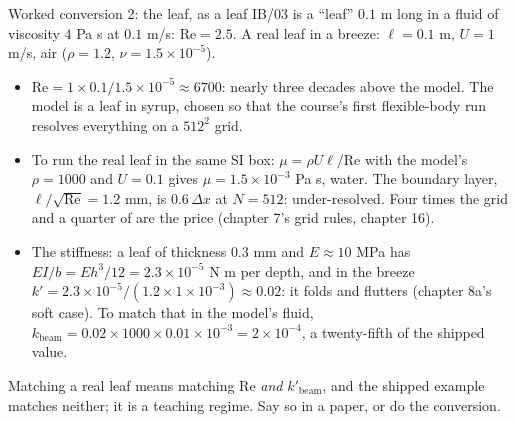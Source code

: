 \documentclass[aspectratio=169,11pt]{beamer}
\begin{document}
\begin{frame}{Worked conversion 2: the leaf, as a leaf}
\label{fr:leafreal}
\small IB/03 is a ``leaf'' $0.1$ m long in a fluid of viscosity $4$ Pa s at $0.1$ m/s: $\mathrm{Re} = 2.5$. A real leaf in a breeze: $\ell = 0.1$ m, $U = 1$ m/s, air ($\rho = 1.2$, $\nu = 1.5\times10^{-5}$).
\begin{itemize}
  \item $\mathrm{Re} = 1\times0.1/1.5\times10^{-5} \approx 6700$: nearly three decades above the model. The model is a leaf in syrup, chosen so that the course's first flexible-body run resolves everything on a $512^2$ grid.
  \item To run the real leaf in the same SI box: $\mu = \rho U\ell/\mathrm{Re}$ with the model's $\rho = 1000$ and $U = 0.1$ gives $\mu = 1.5\times10^{-3}$ Pa s, water. The boundary layer, $\ell/\sqrt{\mathrm{Re}} = 1.2$ mm, is $0.6\,\Delta x$ at $N = 512$: under-resolved. Four times the grid and a quarter of  are the price (chapter 7's grid rules, chapter 16).
  \item The stiffness: a leaf of thickness $0.3$ mm and $E \approx 10$ MPa has $EI/b = Eh^3/12 = 2.3\times10^{-5}$ N m per depth, and in the breeze $k' = 2.3\times10^{-5}/(1.2\times1\times10^{-3}) \approx 0.02$: it folds and flutters (chapter 8a's soft case). To match that in the model's fluid, $k_{\mathrm{beam}} = 0.02\times1000\times0.01\times10^{-3} = 2\times10^{-4}$, a twenty-fifth of the shipped value.
\end{itemize}
\vspace{1mm}
\begin{punchbox}
\small Matching a real leaf means matching $\mathrm{Re}$ \emph{and} $k'_{\mathrm{beam}}$, and the shipped example matches neither; it is a teaching regime. Say so in a paper, or do the conversion.
\end{punchbox}
\end{frame}
\end{document}
